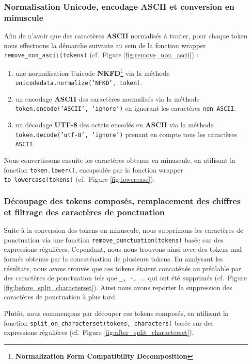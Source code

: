 \documentclass[12pt,a4paper]{report}
\theoremstyle{definition}
\begin{document}
\subsubsection{Normalisation Unicode, encodage ASCII et conversion en minuscule}
Afin de n'avoir que des caractères \textbf{ASCII} normalisés à traiter, pour chaque token nous effectuons la démarche suivante au sein de la fonction wrapper \texttt{remove\_non\_ascii(tokens)} (cf.~Figure \ref{fig:remove_non_ascii}) :
\begin{enumerate}
  \item une normalisation Unicode \textbf{NKFD}\footnote{\textbf{Normalization Form Compatibility Decomposition}} via la méthode \texttt{unicodedata.normalize('NFKD', token)}.
  \item un encodage \textbf{ASCII} des caractères normalisés via la méthode \texttt{token.encode('ASCII', 'ignore')} en ignorant les caractères \texttt{non ASCII}.
  \item un décodage \textbf{UTF-8} des octets encodés en \textbf{ASCII} via la méthode \texttt{token.decode('utf-8', 'ignore')} prenant en compte tous les caractères \texttt{ASCII}.
\end{enumerate}

Nous convertissons ensuite les caractères obtenus en minuscule, en utilisant la fonction \texttt{token.lower()}, encapsulée par la fonction wrapper \texttt{to\_lowercase(tokens)} (cf.~Figure \ref{fig:lowercase}).

\subsubsection{Découpage des tokens composés, remplacement des chiffres et filtrage des caractères de ponctuation}
Suite à la conversion des tokens en minuscule, nous supprimons les caractères de ponctuation via une fonction \texttt{remove\_punctuation(tokens)} basée sur des expressions régulières. Cependant, nous nous trouvons ainsi avec des tokens mal formés obtenus par la concaténation de plusieurs tokens. En analysant les résultats, nous avons trouvés que ces tokens étaient concaténés au préalable par des caractères de ponctuation tels que \texttt{\_, -, $\dots$} qui ont été supprimés (cf.~Figure \ref{fig:before_split_characterset}). Ainsi nous avons reporter la suppression des caractères de ponctuation à plus tard.

Plutôt, nous commençons par découper ces tokens composés, en utilisant la fonction \texttt{split\_on\_characterset(tokens, characters)} basée sur des expressions régulières (cf.~Figure \ref{fig:after_split_characterset}).
\end{document}

